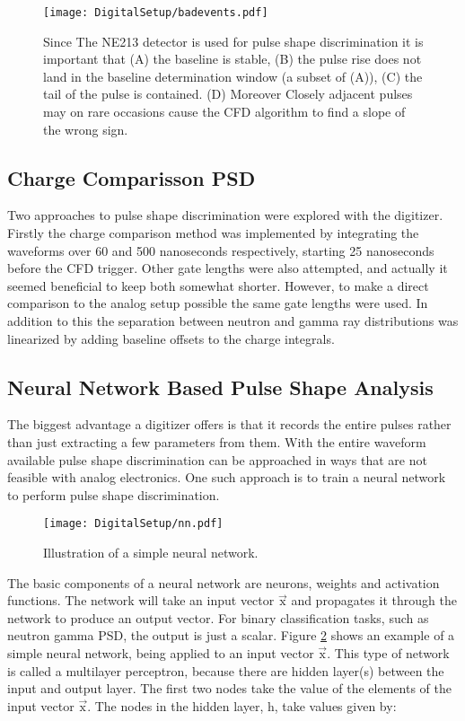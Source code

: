 \documentclass[main.tex]{subfiles}
\begin{document}
\begin{figure}[ht!]
    \centering
        \texttt{[image: DigitalSetup/badevents.pdf]}
        \caption[Examples of rejected digitized events]{Since The NE213 detector is used for pulse shape discrimination it is important that (A) the baseline is stable, (B) the pulse rise does not land in the baseline determination window (a subset of (A)), (C) the tail of the pulse is contained. (D) Moreover Closely adjacent pulses may on rare occasions cause the CFD algorithm to find a slope of the wrong sign.}
    \label{fig:badevents} 
\end{figure}

\subsection{Charge Comparisson PSD}
Two approaches to pulse shape discrimination were explored with the digitizer. Firstly the charge comparison method was implemented by integrating the waveforms over 60 and 500 nanoseconds respectively, starting 25 nanoseconds before the CFD trigger. Other gate lengths were also attempted, and actually it seemed beneficial to keep both somewhat shorter. However, to make a direct comparison to the analog setup possible the same gate lengths were used. In addition to this the separation between neutron and gamma ray distributions was linearized by adding baseline offsets to the charge integrals.

\subsection{Neural Network Based Pulse Shape Analysis}\label{sec:cnn}
The biggest advantage a digitizer offers is that it records the entire pulses rather than just extracting a few parameters from them. With the entire waveform available pulse shape discrimination can be approached in ways that are not feasible with analog electronics. One such approach is to train a neural network to perform pulse shape discrimination. 

\begin{figure}[ht!]
    \centering
        \texttt{[image: DigitalSetup/nn.pdf]}
        \caption[Illustration of a simple neural network]{Illustration of a simple neural network.}
    \label{fig:nn} 
\end{figure}


The basic components of a neural network are neurons, weights and activation functions. The network will take an input vector $\vec{\textrm{x}}$ and propagates it through the network to produce an output vector. For binary classification tasks, such as neutron gamma PSD, the output is just a scalar. Figure \ref{fig:nn} shows an example of a simple neural network, being applied to an input vector $\vec{\textrm{x}}$. This type of network is called a multilayer perceptron, because there are hidden layer(s) between the input and output layer. The first two nodes take the value of the elements of the input vector $\vec{\textrm{x}}$. The nodes in the hidden layer, h, take values given by:
\end{document}
